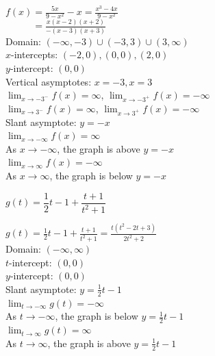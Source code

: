 \documentclass{ximera}
\begin{document}
\begin{question}
\begin{problem}
\begin{solution}
$f(x) = \frac{5x}{9-x^2} - x = \frac{x^{3} - 4x}{9-x^{2}}$\\
$\phantom{f(x)} = \frac{x(x-2)(x+2)}{-(x-3)(x+3)}$\\[10pt]
Domain: $(-\infty, -3) \cup (-3, 3) \cup (3, \infty)$\\
$x$-intercepts: $(-2, 0), (0, 0), (2, 0)$\\
$y$-intercept: $(0, 0)$\\
Vertical asymptotes: $x = -3, x = 3$\\
$\lim_{x \rightarrow -3^{-}} f(x) = \infty$, $\lim_{x \rightarrow -3^{+}} f(x) = -\infty$\\
$\lim_{x \rightarrow 3^{-}} f(x) = \infty$, $\lim_{x \rightarrow  3^{+}} f(x) = -\infty$\\
Slant asymptote: $y = -x$\\
$\lim_{x \rightarrow -\infty} f(x) = \infty$\\
As $x \rightarrow -\infty$, the graph is above $y=-x$\\
$\lim_{x \rightarrow \infty} f(x) = -\infty$\\
As $x \rightarrow \infty$, the graph is below $y=-x$\\

\begin{center} 
\end{center} 
\end{solution}
\end{problem}   

\begin{problem}
$g(t) =\dfrac{1}{2}t-1 + \dfrac{t+1}{t^2+1}$

\begin{solution}
$g(t) = \frac{1}{2}t-1 + \frac{t+1}{t^2+1} = \frac{t(t^2-2t+3)}{2t^2+2}$\\
Domain: $(-\infty,\infty)$\\
$t$-intercept: $(0,0)$\\
$y$-intercept:  $(0,0)$\\
Slant asymptote: $y = \frac{1}{2}t-1$\\
$\lim_{t \rightarrow -\infty} g(t) = -\infty$\\
As $t \rightarrow -\infty$, the graph is below $y = \frac{1}{2}t-1$\\
$\lim_{t \rightarrow \infty} g(t) = \infty$\\
As $t \rightarrow \infty$, the graph is above $y = \frac{1}{2}t-1$\\


\end{solution}
\end{problem}
\end{question}
\end{document}
